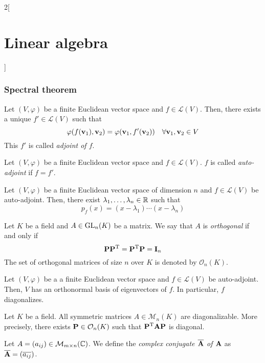 \documentclass[../../../main.tex]{subfiles}
\begin{document}
\begin{multicols}{2}[\section{Linear algebra}]
    \subsubsection*{Spectral theorem}
    \begin{definition}
        Let $(V,\varphi)$ be a finite Euclidean vector space and $f\in\mathcal{L}(V)$. Then, there exists a unique $f'\in\mathcal{L}(V)$ such that $$\varphi(f(\boldsymbol{\mathrm{v}}_1),\boldsymbol{\mathrm{v}}_2)=\varphi(\boldsymbol{\mathrm{v}}_1,f'(\boldsymbol{\mathrm{v}}_2))\quad\forall \boldsymbol{\mathrm{v}}_1,\boldsymbol{\mathrm{v}}_2\in V$$ This $f'$ is called \textit{adjoint of $f$}.
    \end{definition}
    \begin{definition}
        Let $(V,\varphi)$ be a finite Euclidean vector space and $f\in\mathcal{L}(V)$. $f$ is called \textit{auto-adjoint} if $f=f'$.
    \end{definition}
    \begin{lemma}
        Let $(V,\varphi)$ be a finite Euclidean vector space of dimension $n$ and $f\in\mathcal{L}(V)$ be auto-adjoint. Then, there exist $\lambda_1,\ldots,\lambda_n\in\mathbb{R}$ such that $$p_f(x)=(x-\lambda_1 )\cdots(x-\lambda_n)$$
    \end{lemma}
    \begin{definition}
        Let $K$ be a field and $A\in\mathrm{GL}_n(K)$ be a matrix. We say that $A$ is \textit{orthogonal} if and only if $$\boldsymbol{\mathrm{P}}\vb{P}^{\mathrm{T}}=\vb{P}^{\mathrm{T}}\boldsymbol{\mathrm{P}}=\boldsymbol{\mathrm{I}}_n$$ The set of orthogonal matrices of size $n$ over $K$ is denoted by $\mathcal{O}_n(K)$.
    \end{definition}
    \begin{theorem}
        Let $(V,\varphi)$ be a a finite Euclidean vector space and $f\in\mathcal{L}(V)$ be auto-adjoint. Then, $V$ has an orthonormal basis of eigenvectors of $f$. In particular, $f$ diagonalizes.
    \end{theorem}
    \begin{corollary}
        Let $K$ be a field. All symmetric matrices $A\in\mathcal{M}_n(K)$ are diagonalizable. More precisely, there exists $\boldsymbol{\mathrm{P}}\in\mathcal{O}_n(K)$ such that $\vb{P}^{\mathrm{T}}\boldsymbol{\mathrm{A}}\boldsymbol{\mathrm{P}}$ is diagonal.
    \end{corollary}
    \begin{definition}
        Let $A=(a_{ij})\in\mathcal{M}_{m\times n}(\mathbb{C})$. We define the \textit{complex conjugate $\overline{\boldsymbol{\mathrm{A}}}$ of $\boldsymbol{\mathrm{A}}$} as $\overline{\boldsymbol{\mathrm{A}}}=(\overline{a_{ij}})$.

\end{definition}
\end{multicols}
\end{document}
